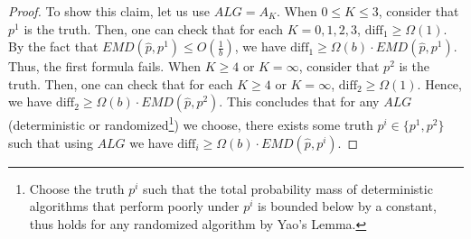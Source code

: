 \begin{proof}
To show this claim, let us use $ALG = A_K$. When $0 \leq K \leq 3$, consider that $p^1$ is the truth. Then, one can check that for each $K=0,1,2,3$, $\text{diff}_1 \geq \Omega(1)$. By the fact that $EMD(\hat{p},p^1) \leq O(\frac{1}{b})$, we have $\text{diff}_1 \geq \Omega(b) \cdot EMD(\hat{p},p^1)$. Thus, the first formula fails. When $K \geq 4$ or $K=\infty$, consider that $p^2$ is the truth. Then, one can check that for each $K \geq 4$ or $K=\infty$, $\text{diff}_2 \geq \Omega(1)$. Hence, we have $\text{diff}_2 \geq \Omega(b) \cdot EMD(\hat{p},p^2)$. This concludes that for any $ALG$ (deterministic or randomized\footnote{Choose the truth $p^i$ such that the total probability mass of deterministic algorithms that perform poorly under $p^i$ is bounded below by a constant, thus holds for any randomized algorithm by Yao's Lemma.}) we choose, there exists some truth $p^i \in \{p^1,p^2\}$ such that using $ALG$ we have $\text{diff}_i \geq \Omega(b) \cdot EMD(\hat{p},p^i)$.
\end{proof}

